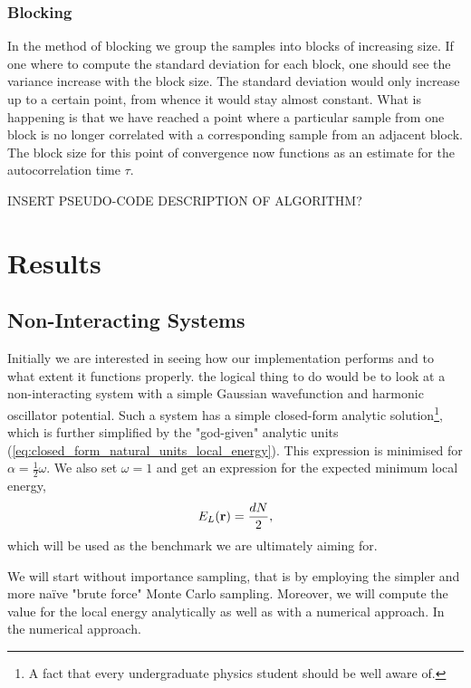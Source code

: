 \documentclass[
    a4paper, aps, twocolumn, floatfix, superscriptaddress, nofootinbib]{revtex4-1}
\newcommand{\1}{\mathds{1}}
\begin{document}
        \subsubsection{Blocking}
        In the method of blocking we group the samples into blocks of increasing size. If one where to compute
        the standard deviation for each block, one should see the variance increase with the block size.
        The standard deviation would only increase up to a certain point, from whence it would stay
        almost constant. What is happening is that we have reached a point where a particular
        sample from one block is no longer correlated with a corresponding sample from an adjacent block.
        The block size for this point of convergence now functions as an estimate for the autocorrelation
        time $\tau$.

        INSERT PSEUDO-CODE DESCRIPTION OF ALGORITHM?

\section{Results}

	\subsection{Non-Interacting Systems}
	Initially we are interested in seeing how our implementation performs and to what extent it functions properly.
	the logical thing to do would be to look at a non-interacting system with a simple Gaussian wavefunction and
	harmonic oscillator potential. Such a system has a simple closed-form analytic solution\footnote{A fact that every
	undergraduate physics student should be well aware of.}, which is further simplified by the "god-given" analytic
	units (\autoref{eq:closed_form_natural_units_local_energy}). This expression is minimised for
	$\alpha = \frac{1}{2}\omega$. We also set $\omega = 1$ and get an expression for the
	expected minimum local energy,
	\begin{equation}
		E_L(\vb{r}) = \frac{dN}{2},
	\end{equation}
	which will be used as the benchmark we are ultimately aiming for.
	
	We will start without importance sampling, that is by employing the simpler and more naïve "brute force" Monte Carlo
	sampling. Moreover, we will compute the value for the local energy analytically as well as with a numerical approach.
	In the numerical approach.
\end{document}
